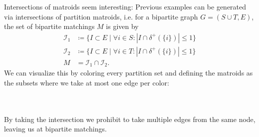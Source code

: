 \begin{remark} \label{rmk:intersection_matroid}
    Intersections of matroids seem interesting:
    Previous examples can be generated via intersections of partition matroids,
    i.e. for a bipartite graph $G = (S \cup T, E)$, the set of bipartite matchings $M$ is given by
    \begin{align*}
        \mathcal I_1 & \coloneqq \{I \subset E \mid \forall i \in S: |I \cap \delta^+(\{i\})| \leq 1\} \\
        \mathcal I_2 & \coloneqq \{I \subset E \mid \forall i \in T: |I \cap \delta^+(\{i\})| \leq 1\} \\
        M            & = \mathcal I_1\cap \mathcal I_2.
    \end{align*}
    We can visualize this by coloring every partition set and defining the matroids as the subsets
    where we take at most one edge per color:
    \\
    \\
    \begin{minipage}{\textwidth}
        \centering
    \end{minipage}
    \vspace{5pt}
    \\
    By taking the intersection we prohibit to take multiple edges from the same node, leaving us at bipartite matchings.
\end{remark}